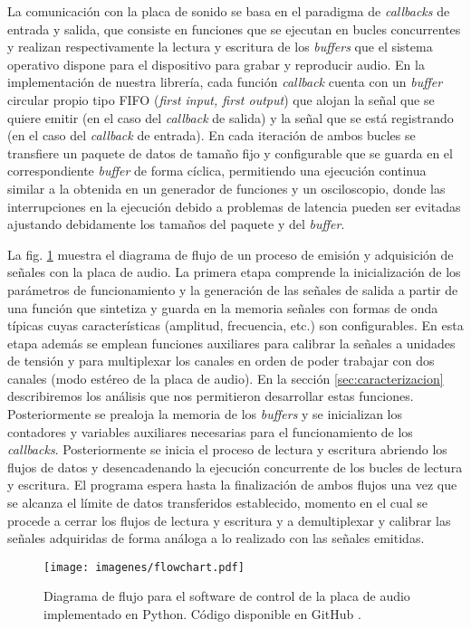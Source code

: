 \documentclass[a4paper,11pt]{article}
\begin{document}
	La comunicación con la placa de sonido se basa en el paradigma de \emph{callbacks} de entrada y salida, que consiste en funciones que se ejecutan en bucles concurrentes y realizan respectivamente la lectura y escritura de los \emph{buffers} que el sistema operativo dispone para el dispositivo para grabar y reproducir audio. En la implementación de nuestra librería, cada función \emph{callback} cuenta con un \emph{buffer} circular propio tipo FIFO (\emph{first input, first output}) que alojan la señal que se quiere emitir (en el caso del \emph{callback} de salida) y la señal que se está registrando (en el caso del \emph{callback} de entrada). En cada iteración de ambos bucles se transfiere un paquete de datos de tamaño fijo y configurable que se guarda en el correspondiente \emph{buffer} de forma cíclica, permitiendo una ejecución continua similar a la obtenida en un generador de funciones y un osciloscopio, donde las interrupciones en la ejecución debido a problemas de latencia pueden ser evitadas ajustando debidamente los tamaños del paquete y del \emph{buffer}.

	La fig. \ref{fig:flowchart} muestra el diagrama de flujo de un proceso de emisión y adquisición de señales con la placa de audio. La primera etapa comprende la inicialización de los parámetros de funcionamiento y la generación de las señales de salida a partir de una función que sintetiza y guarda en la memoria señales con formas de onda típicas cuyas características (amplitud, frecuencia, etc.) son configurables. En esta etapa además se emplean funciones auxiliares para calibrar la señales a unidades de tensión y para multiplexar los canales en orden de poder trabajar con dos canales (modo estéreo de la placa de audio). En la sección \ref{sec:caracterizacion} describiremos los análisis que nos permitieron desarrollar estas funciones. Posteriormente se prealoja la memoria de los \emph{buffers} y se inicializan los contadores y variables auxiliares necesarias para el funcionamiento de los \emph{callbacks}. Posteriormente se inicia el proceso de lectura y escritura abriendo los flujos de datos y desencadenando la ejecución concurrente de los bucles de lectura y escritura. El programa espera hasta la finalización de ambos flujos una vez que se alcanza el límite de datos transferidos establecido, momento en el cual se procede a cerrar los flujos de lectura y escritura y a demultiplexar y calibrar las señales adquiridas de forma análoga a lo realizado con las señales emitidas.
	
    \begin{figure}[!h] 
        \centering
        \texttt{[image: imagenes/flowchart.pdf]}
        \caption{Diagrama de flujo para el software de control de la placa de audio implementado en Python. Código disponible en GitHub \cite{repo}.}
        \label{fig:flowchart}
 
    \end{figure}
    \clearpage
	
\end{document}
